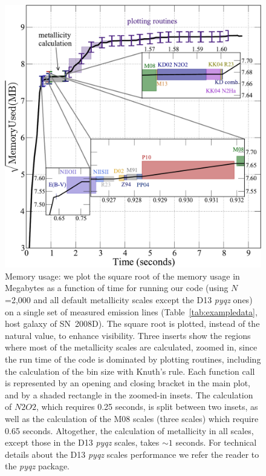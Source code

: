 \documentclass{emulateapj}
\begin{document}
\begin{figure}[ht!]
  \includegraphics[width=1.0\columnwidth]{memusage.pdf}
   \caption{Memory usage: we plot the square root of the memory usage in Megabytes as a function of time for running our code (using $N$=2,000 and all default metallicity scales except the D13 \emph{pyqz} ones) on a single set of measured emission lines (Table~\ref{tab:exampledata}, host galaxy of SN~2008D). The square root is plotted, instead of the natural value, to enhance visibility.  
Three inserts show the regions where most of the metallicity scales are calculated, zoomed in, since the run time of the code is dominated by plotting routines, including the calculation of the bin size with Knuth's rule. 
Each function call is represented by an opening and closing bracket in the main plot, and by a shaded rectangle in the zoomed-in insets.
The calculation of $N2O2$, which requires 0.25 seconds, is split between two insets, as well as the calculation of the M08 scales (three scales) which require 0.65 seconds. Altogether, the calculation of metallicity in all scales, except those in the D13 \emph{pyqz} scales, takes $\sim1$ seconds. For technical details about the D13 \emph{pyqz} scales performance we refer the reader to the \emph{pyqz} package.}
 \label{fig:mem}
\end{figure}
\end{document}
